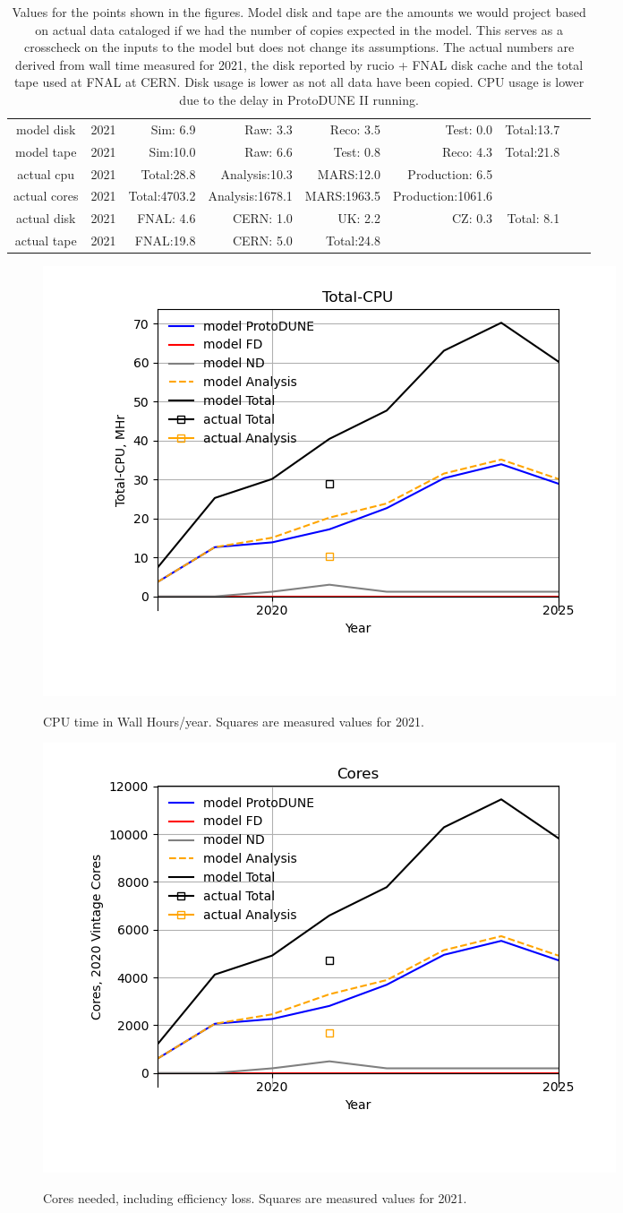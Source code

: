 \documentclass[12pt]{article}
\begin{document}
\begin{table}
\footnotesize
 \centering \begin{tabular}[h]{crrrrrrrr}
          model disk&2021&Sim: 6.9&Raw: 3.3&Reco: 3.5&Test: 0.0&Total:13.7\\
          model tape&2021&Sim:10.0&Raw: 6.6&Test: 0.8&Reco: 4.3&Total:21.8\\
          actual cpu&2021&Total:28.8&Analysis:10.3&MARS:12.0&Production: 6.5\\
        actual cores&2021&Total:4703.2&Analysis:1678.1&MARS:1963.5&Production:1061.6\\
         actual disk&2021&FNAL: 4.6&CERN: 1.0&UK: 2.2&CZ: 0.3&Total: 8.1\\
         actual tape&2021&FNAL:19.8&CERN: 5.0&Total:24.8\\
\end{tabular}
\caption{Values for the points shown in the figures. Model disk and tape are the amounts we would project based on actual data cataloged if we had the number of copies expected in the model. This serves as a crosscheck on the inputs to the model but does not change its assumptions.  The actual numbers are derived from wall time measured for 2021, the disk reported by rucio + FNAL disk cache and the total tape used at FNAL at CERN. Disk usage is lower as not all data have been copied. CPU usage is lower due to the delay in ProtoDUNE II running.}\normalsize
 \end{table}
\pagebreak\begin{figure}[h]
\centering\includegraphics[height=0.4\textwidth]{Parameters_2022-01-16-2025-newformat-Total-CPU.png}\label{TotalCPU}
\caption{CPU time in Wall Hours/year. Squares are measured values for 2021.}
\end{figure}
\begin{figure}[h]
\centering\includegraphics[height=0.4\textwidth]{Parameters_2022-01-16-2025-newformat-Cores.png}\label{Cores}
\caption{Cores needed, including efficiency loss. Squares are measured values for 2021.}
\end{figure}
\end{document}
